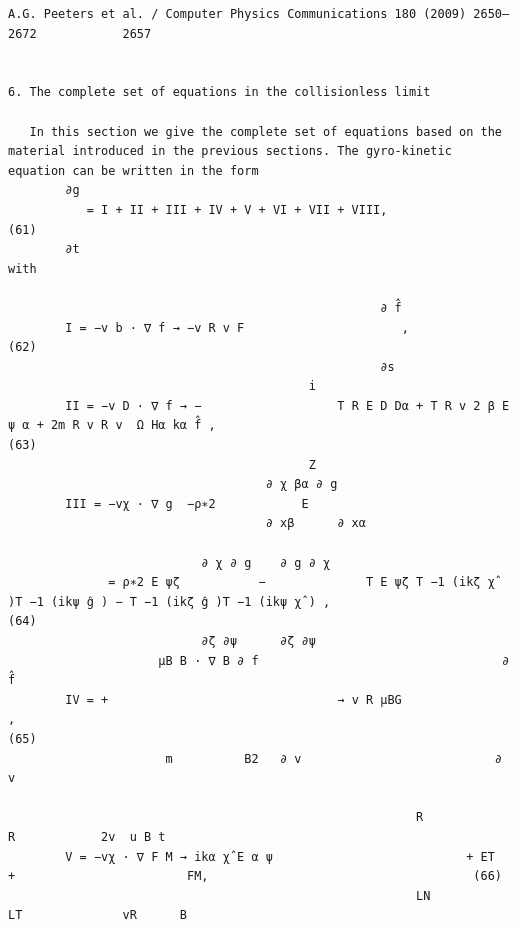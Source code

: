 \documentclass[a4paper]{article}
\newcommand{\gkwpagefont}{\fontsize{6.0pt}{7.55pt}\selectfont}
\begin{document}
\begin{Verbatim}[fontsize=\gkwpagefont]
                                                                 A.G. Peeters et al. / Computer Physics Communications 180 (2009) 2650–2672            2657


6. The complete set of equations in the collisionless limit

   In this section we give the complete set of equations based on the material introduced in the previous sections. The gyro-kinetic
equation can be written in the form
        ∂g
           = I + II + III + IV + V + VI + VII + VIII,                                                                                                  (61)
        ∂t
with

                                                    ∂ f̂
        I = −v b · ∇ f → −v R v F                      ,                                                                                             (62)
                                                    ∂s
                                          i
        II = −v D · ∇ f → −                   T R E D Dα + T R v 2 β E ψ α + 2m R v R v  Ω Hα kα f̂ ,                                                (63)
                                          Z
                                    ∂ χ βα ∂ g
        III = −vχ · ∇ g  −ρ∗2            E
                                    ∂ xβ      ∂ xα
                                             
                           ∂ χ ∂ g    ∂ g ∂ χ                                                                       
              = ρ∗2 E ψζ           −              T E ψζ T −1 (ikζ χ̂ )T −1 (ikψ ĝ ) − T −1 (ikζ ĝ )T −1 (ikψ χ̂ ) ,                                (64)
                           ∂ζ ∂ψ      ∂ζ ∂ψ
                     μB B · ∇ B ∂ f                                  ∂ f̂
        IV = +                                → v R μBG                   ,                                                                            (65)
                      m          B2   ∂ v                           ∂ v
                                                                                                          
                                                         R                    R            2v  u B t
        V = −vχ · ∇ F M → ikα χ̂ E α ψ                           + ET                 +                        FM,                                     (66)
                                                         LN                   LT              vR      B
                                                                                                                                            

\end{Verbatim}
\end{document}
